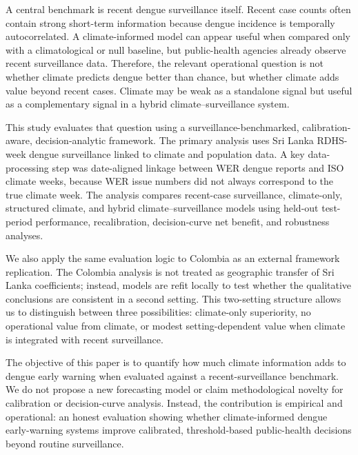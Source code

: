\documentclass[11pt,a4paper]{article}
\begin{document}
A central benchmark is recent dengue surveillance itself. Recent case counts often contain strong short-term information because dengue incidence is temporally autocorrelated. A climate-informed model can appear useful when compared only with a climatological or null baseline, but public-health agencies already observe recent surveillance data. Therefore, the relevant operational question is not whether climate predicts dengue better than chance, but whether climate adds value beyond recent cases. Climate may be weak as a standalone signal but useful as a complementary signal in a hybrid climate--surveillance system.

This study evaluates that question using a surveillance-benchmarked, calibration-aware, decision-analytic framework. The primary analysis uses Sri Lanka RDHS-week dengue surveillance linked to climate and population data. A key data-processing step was date-aligned linkage between WER dengue reports and ISO climate weeks, because WER issue numbers did not always correspond to the true climate week. The analysis compares recent-case surveillance, climate-only, structured climate, and hybrid climate--surveillance models using held-out test-period performance, recalibration, decision-curve net benefit, and robustness analyses.

We also apply the same evaluation logic to Colombia as an external framework replication. The Colombia analysis is not treated as geographic transfer of Sri Lanka coefficients; instead, models are refit locally to test whether the qualitative conclusions are consistent in a second setting. This two-setting structure allows us to distinguish between three possibilities: climate-only superiority, no operational value from climate, or modest setting-dependent value when climate is integrated with recent surveillance.

The objective of this paper is to quantify how much climate information adds to dengue early warning when evaluated against a recent-surveillance benchmark. We do not propose a new forecasting model or claim methodological novelty for calibration or decision-curve analysis. Instead, the contribution is empirical and operational: an honest evaluation showing whether climate-informed dengue early-warning systems improve calibrated, threshold-based public-health decisions beyond routine surveillance.
\end{document}
